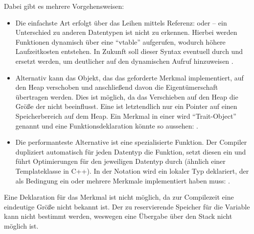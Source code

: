 Dabei gibt es mehrere Vorgehensweisen:
\begin{itemize}
	\item Die einfachste Art erfolgt über das Leihen mittels Referenz:  oder  -- ein Unterschied zu anderen Datentypen ist nicht zu erkennen.
	Hierbei werden Funktionen dynamisch über eine \enquote{vtable} aufgerufen, wodurch höhere Laufzeitkosten entstehen.
	In Zukunft soll dieser Syntax eventuell durch  und  ersetzt werden, um deutlicher auf den dynamischen Aufruf hinzuweisen \cite{rust:github:dyn}.
	
	\item Alternativ kann das Objekt, das das geforderte Merkmal implementiert, auf den Heap verschoben und anschließend davon die Eigentümerschaft übertragen werden.
	Dies ist möglich, da das Verschieben auf den Heap die Größe der  nicht beeinflusst.
	Eine  ist letztendlich nur ein Pointer auf einen Speicherbereich auf dem Heap.
	Ein Merkmal in einer  wird \enquote{Trait-Object} genannt und eine Funktionsdeklaration könnte so aussehen: .
	
	\item Die performanteste Alternative ist eine spezialisierte Funktion.
	Der Compiler dupliziert automatisch für jeden Datentyp die Funktion, setzt diesen ein und führt Optimierungen für den jeweiligen Datentyp durch (ähnlich einer Templateklasse in C++).
	In der Notation wird ein lokaler Typ deklariert, der als Bedingung ein oder mehrere Merkmale implementiert haben muss: .
\end{itemize}

Eine Deklaration  für das Merkmal  ist nicht möglich, da zur Compilezeit eine eindeutige Größe nicht bekannt ist.
Der zu reservierende Speicher für die Variable kann nicht bestimmt werden, weswegen eine Übergabe über den Stack nicht möglich ist.


